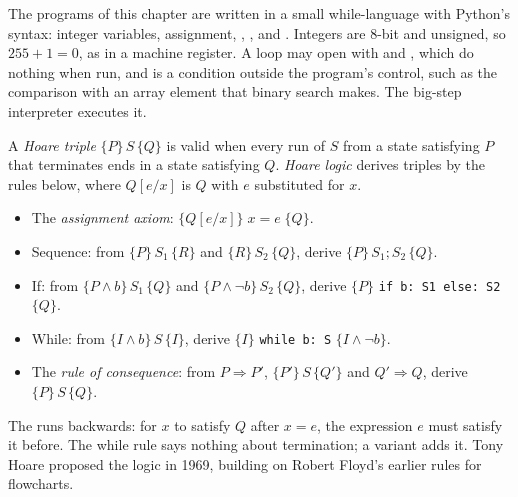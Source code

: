 The programs of this chapter are written in a small while-language with Python's syntax: integer variables, assignment, , ,  and . Integers are 8-bit and unsigned, so $255 + 1 = 0$, as in a machine register. A loop may open with  and , which do nothing when run, and  is a condition outside the program's control, such as the comparison with an array element that binary search makes. The big-step interpreter  executes it.

\label{lst:b3:program-verification:run}

\begin{definition}\label{def:b3:program-verification:hoare}
A \emph{Hoare triple} $\{P\}\,S\,\{Q\}$ is valid when every run of $S$ from a state satisfying $P$ that terminates ends in a state satisfying $Q$. \emph{Hoare logic} derives triples by the rules below, where $Q[e/x]$ is $Q$ with $e$ substituted for $x$.
\begin{itemize}
  \item The \emph{assignment axiom}: $\{Q[e/x]\}\; x = e\; \{Q\}$.
  \item Sequence: from $\{P\}\,S_1\,\{R\}$ and $\{R\}\,S_2\,\{Q\}$, derive $\{P\}\,S_1; S_2\,\{Q\}$.
  \item If: from $\{P \wedge b\}\,S_1\,\{Q\}$ and $\{P \wedge \neg b\}\,S_2\,\{Q\}$, derive $\{P\}$ \texttt{if b:\ S1 else:\ S2} $\{Q\}$.
  \item While: from $\{I \wedge b\}\,S\,\{I\}$, derive $\{I\}$ \texttt{while b:\ S} $\{I \wedge \neg b\}$.
  \item The \emph{rule of consequence}: from $P \Rightarrow P'$, $\{P'\}\,S\,\{Q'\}$ and $Q' \Rightarrow Q$, derive $\{P\}\,S\,\{Q\}$.
\end{itemize}
\end{definition}

The  runs backwards: for $x$ to satisfy $Q$ after $x = e$, the expression $e$ must satisfy it before. The while rule says nothing about termination; a variant adds it. Tony Hoare proposed the logic in 1969, building on Robert Floyd's earlier rules for flowcharts. %

